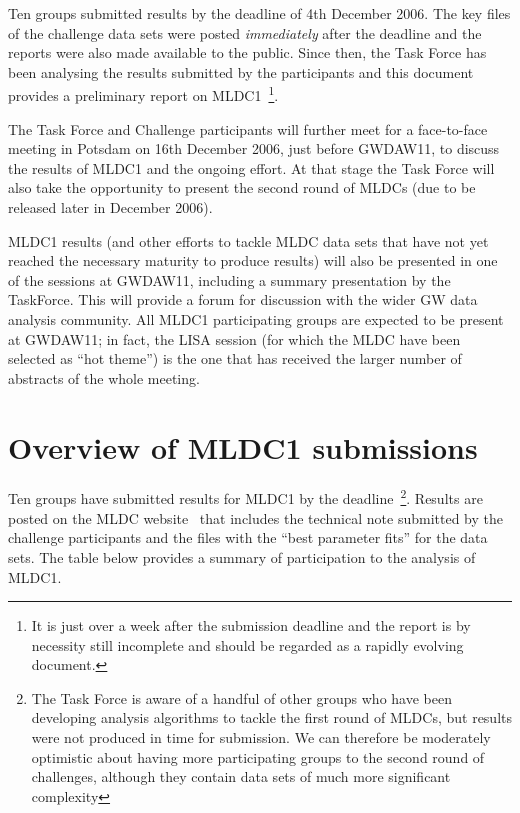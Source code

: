 \documentclass[11pt]{article}
\begin{document}
Ten groups submitted results by the deadline of 4th December 2006. The key files of the challenge data sets were posted {\em immediately} after the deadline and the reports were also made available to the public. Since then, the Task Force has been analysing the results submitted by the participants and this document provides a preliminary report on MLDC1~\footnote{It is just over a week after the submission deadline and the report is by necessity still incomplete and should be regarded as a rapidly evolving document.}. 

The Task Force and Challenge participants will further meet for a face-to-face meeting in Potsdam on 16th December 2006, just before GWDAW11, to discuss the results of MLDC1 and the ongoing effort. At that stage the Task Force will also take the opportunity to present the second round of MLDCs (due to be released later in December 2006).

MLDC1 results (and other efforts to tackle MLDC data sets that have not yet reached the necessary maturity to produce results) will also be presented in one of the sessions at GWDAW11, including a summary presentation by the TaskForce. This will provide a forum for discussion with the wider GW data analysis community. All MLDC1 participating groups are expected to be present at GWDAW11; in fact, the LISA session (for which the MLDC have been selected as ``hot theme'') is the one that has received the larger number of abstracts of the whole meeting.

\section{Overview of MLDC1 submissions}

Ten groups have submitted results for MLDC1 by the deadline~\footnote{The Task Force is aware of a handful of other groups who have been developing analysis algorithms to tackle the first round of MLDCs, but results were not produced in time for submission. We can therefore be moderately optimistic about having more participating groups to the second round of challenges, although they contain data sets of much more significant complexity}. Results are posted on the MLDC website~\cite{mldc-results} that includes the technical note submitted by the challenge participants and the files with the ``best parameter fits'' for the data sets. The table below provides a summary of participation to the analysis of MLDC1.
\end{document}
